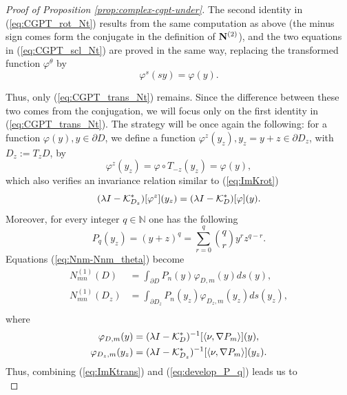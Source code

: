 \begin{proof}[Proof of Proposition \ref{prop:complex-cgpt-under}]
The second identity in (\ref{eq:CGPT_rot_Nt}) results from the
same computation as above (the minus sign comes form the conjugate
in the definition of $\mathbf{N}^{(2)}$), and the two equations in
(\ref{eq:CGPT_scl_Nt}) are proved in the same way, replacing the
transformed function $\varphi^\theta$ by
\begin{equation*}
\varphi^s(sy)=\varphi(y).
\end{equation*}

Thus, only (\ref{eq:CGPT_trans_Nt}) remains. Since the difference
between these two comes from the conjugation, we will focus only
on the first identity in (\ref{eq:CGPT_trans_Nt}). The strategy
will be once again the following: for a function $\varphi(y), y
\in
\partial D$, we define a function $\varphi^z(y_z), y_z =y + z \in
\partial D_z$, with $D_z:=T_z D$,  by
\begin{equation*}
\varphi^z(y_z)=\varphi \circ T_{-z}(y_z)=\varphi(y),
\end{equation*}
which also verifies an invariance relation similar to
(\ref{eq:ImKrot})
\begin{equation}
(\lambda I - \mathcal{K}^*_{D_z})[\varphi^z](y_z) = (\lambda I - \mathcal{K}^*_{D})
[\varphi] (y). \label{eq:ImKtrans}
\end{equation}
Moreover, for every integer $q\in\mathbb{N}$ one has the following
\begin{equation}
P_q(y_z) = (y+z)^q = \sum_{r=0}^q  \binom {q} {r} y^r z^{q-r}.
\label{eq:develop_P_q}
\end{equation}
Equations (\ref{eq:Nnm-Nnm_theta}) become
\begin{equation*}
\begin{aligned}
N_{mn}^{(1)}(D) &= \int_{\partial D} P_n(y) \varphi_{D,m}(y) ds(y),\\
N_{mn}^{(1)}(D_z) &= \int_{\partial D_z} P_n(y_z) \varphi_{D_z,m}(y_z) ds(y_z),\\
\end{aligned}
\end{equation*}
where
\begin{equation*}
\begin{aligned}
\varphi_{D,m}(y) &= (\lambda I - \mathcal{K}^*_{D})^{-1}[\langle \nu, \nabla P_m\rangle](y), \\
\varphi_{D_z,m}(y_z) &= (\lambda I - \mathcal{K}^*_{D_z})^{-1}[\langle \nu,
\nabla P_m \rangle](y_z).
\end{aligned}
\end{equation*}
Thus, combining (\ref{eq:ImKtrans}) and (\ref{eq:develop_P_q})
leads us to
\begin{equation*}

\end{equation*}
\end{proof}
